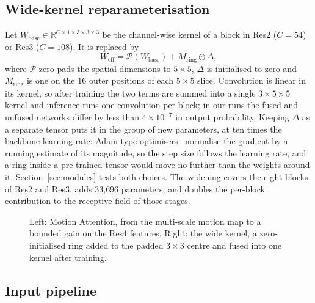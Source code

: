 \documentclass[conference]{IEEEtran}
\begin{document}
\subsection{Wide-kernel reparameterisation}
\label{sec:wk}

Let $W_{\text{base}} \in \mathbb{R}^{C \times 1 \times 3 \times 3 \times
3}$ be the channel-wise kernel of a block in Res2 ($C=54$) or Res3
($C=108$). It is replaced by
\begin{equation}
  W_{\text{eff}} = \mathcal{P}(W_{\text{base}}) + M_{\text{ring}} \odot \Delta ,
  \label{eq:rep}
\end{equation}
where $\mathcal{P}$ zero-pads the spatial dimensions to $5\times5$,
$\Delta$ is initialised to zero and $M_{\text{ring}}$ is one on the 16
outer positions of each $5\times5$ slice. Convolution is linear in its
kernel, so after training the two terms are summed into a single
$3\times5\times5$ kernel and inference runs one convolution per block; in
our runs the fused and unfused networks differ by less than
$4\times10^{-7}$ in output probability. Keeping $\Delta$ as a separate
tensor puts it in the group of new parameters, at ten times the backbone
learning rate: Adam-type optimisers~\cite{adamw} normalise the gradient by
a running estimate of its magnitude, so the step size follows the learning
rate, and a ring inside a pre-trained tensor would move no further than the
weights around it. Section~\ref{sec:modules} tests both choices. The
widening covers the eight blocks of Res2 and Res3, adds 33{,}696
parameters, and doubles the per-block contribution to the receptive field
of those stages.

\begin{figure}[t]
  \centering
  \caption{Left: Motion Attention, from the multi-scale motion map to a
  bounded gain on the Res4 features. Right: the wide kernel, a
  zero-initialised ring added to the padded $3\times3$ centre and fused
  into one kernel after training.}
  \label{fig:modules}
\end{figure}

\subsection{Input pipeline}
\end{document}
